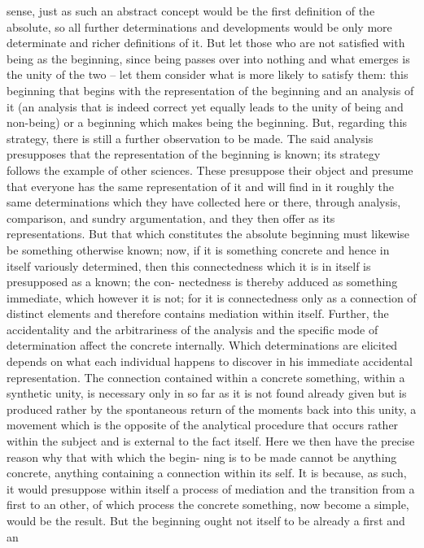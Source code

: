 sense, just as such an abstract concept would be the first definition of the
absolute, so all further determinations and developments would be only
more determinate and richer definitions of it. But let those who are not
satisfied with being as the beginning, since being passes over into nothing
and what emerges is the unity of the two – let them consider what is more
likely to satisfy them: this beginning that begins with the representation
of the beginning and an analysis of it (an analysis that is indeed correct yet
equally leads to the unity of being and non-being) or a beginning which
makes being the beginning.
But, regarding this strategy, there is still a further observation to be made.
The said analysis presupposes that the representation of the beginning is
known; its strategy follows the example of other sciences. These presuppose
their object and presume that everyone has the same representation of it and
will find in it roughly the same determinations which they have collected
here or there, through analysis, comparison, and sundry argumentation,
and they then offer as its representations. But that which constitutes the
absolute beginning must likewise be something otherwise known; now,
if it is something concrete and hence in itself variously determined, then
this connectedness which it is in itself is presupposed as a known; the con-
nectedness is thereby adduced as something immediate, which however it is
not; for it is connectedness only as a connection of distinct elements and
therefore contains mediation within itself. Further, the accidentality and
the arbitrariness of the analysis and the specific mode of determination
affect the concrete internally. Which determinations are elicited depends
on what each individual happens to discover in his immediate accidental
representation. The connection contained within a concrete something,
within a synthetic unity, is necessary only in so far as it is not found already
given but is produced rather by the spontaneous return of the moments
back into this unity, a movement which is the opposite of the analytical
procedure that occurs rather within the subject and is external to the fact
itself.
Here we then have the precise reason why that with which the begin-
ning is to be made cannot be anything concrete, anything containing a
connection within its self. It is because, as such, it would presuppose within
itself a process of mediation and the transition from a first to an other, of
which process the concrete something, now become a simple, would be
the result. But the beginning ought not itself to be already a first and an
